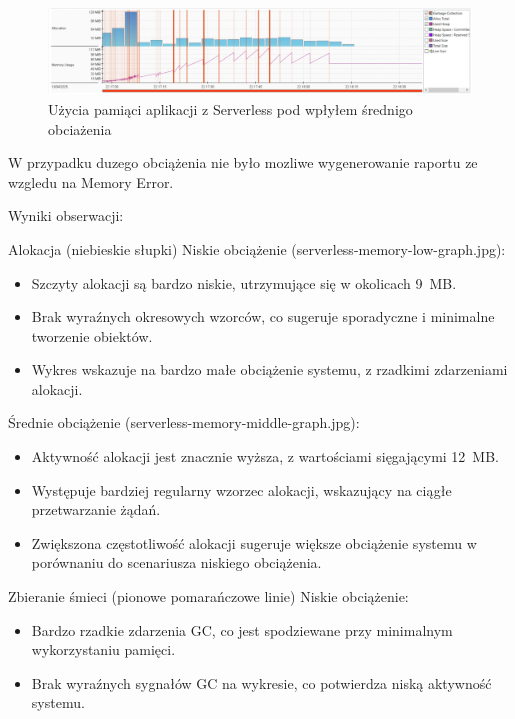 \documentclass[runningheads,12pt]{llncs}
\begin{document}
\begin{figure}
    \includegraphics[width=\linewidth]{images/serverless-memory-middle-graph.jpg}
    \caption{Użycia pamiąci aplikacji z Serverless pod wpłyłem średnigo obciażenia} \label{fig1}
\end{figure}

W przypadku duzego obciążenia nie było mozliwe wygenerowanie raportu ze wzgledu na Memory Error.

Wyniki obserwacji:

Alokacja (niebieskie słupki)
Niskie obciążenie (serverless-memory-low-graph.jpg):
\begin{itemize}
    \item Szczyty alokacji są bardzo niskie, utrzymujące się w okolicach 9~MB.
    \item Brak wyraźnych okresowych wzorców, co sugeruje sporadyczne i minimalne tworzenie obiektów.
    \item Wykres wskazuje na bardzo małe obciążenie systemu, z rzadkimi zdarzeniami alokacji.
\end{itemize}

Średnie obciążenie (serverless-memory-middle-graph.jpg):
\begin{itemize}
    \item Aktywność alokacji jest znacznie wyższa, z wartościami sięgającymi 12~MB.
    \item Występuje bardziej regularny wzorzec alokacji, wskazujący na ciągłe przetwarzanie żądań.
    \item Zwiększona częstotliwość alokacji sugeruje większe obciążenie systemu w porównaniu do scenariusza niskiego obciążenia.
\end{itemize}

\vspace{0.5cm}

Zbieranie śmieci (pionowe pomarańczowe linie)
Niskie obciążenie:
\begin{itemize}
    \item Bardzo rzadkie zdarzenia GC, co jest spodziewane przy minimalnym wykorzystaniu pamięci.
    \item Brak wyraźnych sygnałów GC na wykresie, co potwierdza niską aktywność systemu.
\end{itemize}
\end{document}
